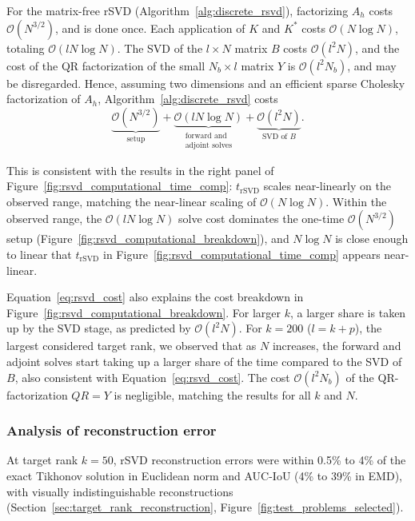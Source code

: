 For the matrix-free rSVD (Algorithm~\ref{alg:discrete_rsvd}), factorizing $A_h$ costs $\mathcal{O}(N^{3/2})$, and is done once. Each application of $K$ and $K^*$ costs $\mathcal{O}(N \log N)$, totaling $\mathcal{O}(l N \log N)$. The SVD of the $l \times N$ matrix $B$ costs $\mathcal{O}(l^2 N)$, and the cost of the QR factorization of the small $N_b \times l$ matrix $Y$ is $\mathcal{O}(l^2 N_b)$, and may be disregarded. Hence, assuming two dimensions and an efficient sparse Cholesky factorization of $A_h$, Algorithm~\ref{alg:discrete_rsvd} costs
\begin{equation}\label{eq:rsvd_cost}
    \underbrace{\mathcal{O}(N^{3/2})}_{\text{setup}}
    + \underbrace{\mathcal{O}(l N \log N)}_{\substack{\text{forward and} \\ \text{adjoint solves}}}
    + \underbrace{\mathcal{O}(l^2 N)}_{\text{SVD of } B}.
\end{equation}

This is consistent with the results in the right panel of Figure~\ref{fig:rsvd_computational_time_comp}: $t_{\text{rSVD}}$ scales near-linearly on the observed range, matching the near-linear scaling of $\mathcal{O}(N \log N)$. Within the observed range, the $\mathcal{O}(lN\log N)$ solve cost dominates the one-time $\mathcal{O}(N^{3/2})$ setup (Figure~\ref{fig:rsvd_computational_breakdown}), and $N\log N$ is close enough to linear that $t_{\text{rSVD}}$ in Figure~\ref{fig:rsvd_computational_time_comp} appears near-linear.

Equation~\eqref{eq:rsvd_cost} also explains the cost breakdown in Figure~\ref{fig:rsvd_computational_breakdown}. For larger $k$, a larger share is taken up by the SVD stage, as predicted by $\mathcal{O}(l^2 N)$. For $k = 200$ ($l = k + p$), the largest considered target rank, we observed that as $N$ increases, the forward and adjoint solves start taking up a larger share of the time compared to the SVD of $B$, also consistent with Equation~\eqref{eq:rsvd_cost}. The cost $\mathcal{O}(l^2 N_b)$ of the QR-factorization $QR = Y$ is negligible, matching the results for all $k$ and $N$.


\subsubsection{Analysis of reconstruction error}\label{sec:analysis_of_reconstruction_error}
At target rank $k = 50$, rSVD reconstruction errors were within 0.5\% to 4\% of the exact Tikhonov solution in Euclidean norm and AUC-IoU (4\% to 39\% in EMD), with visually indistinguishable reconstructions (Section~\ref{sec:target_rank_reconstruction}, Figure~\ref{fig:test_problems_selected}).

